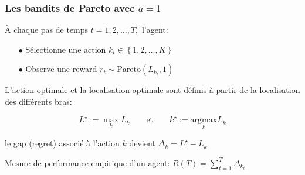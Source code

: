 \documentclass[8pt,sans,aspectratio=169]{beamer}
\begin{document}
\begin{frame}

\frametitle{Les bandits de Pareto avec $a=1$}

À chaque pas de temps $t=1,2,\ldots,T,$ l'agent:

\begin{itemize}

\item[$\bullet$] Sélectionne une action $k_t\in\left\{1,2,\ldots,K\right\}$

\item[$\bullet$] Observe une reward $r_t\sim \mathrm{Pareto}(L_{k_t},1)$

\end{itemize}

\vfill
\pause

L'action optimale et la localisation optimale sont définis à partir de la localisation des différents bras:

\pause
$$\displaystyle L^{\star} := \max_k L_k \qquad \text{et} \qquad k^{\star} := \underset{k}{\mathrm{argmax}} L_k$$ 

\pause
\vfill

le gap (regret) associé à l'action $k$ devient $\Delta_k= L^{\star}-L_k$ 

\pause
\vfill

Mesure de performance empirique d'un agent: $\displaystyle R(T)=\sum_{t=1}^T \Delta_{k_t}$

\end{frame}
\end{document}
